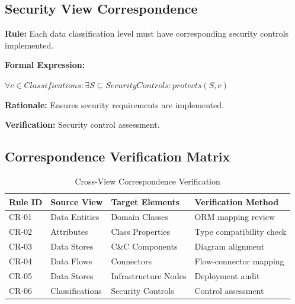 \documentclass[11pt,letterpaper]{article}
\begin{document}
\subsection{Security View Correspondence}

\begin{definitionbox}
\textbf{Rule:} Each data classification level must have corresponding security controls implemented.

\textbf{Formal Expression:}
\begin{center}
$\forall c \in Classifications : \exists S \subseteq SecurityControls : protects(S, c)$
\end{center}

\textbf{Rationale:} Ensures security requirements are implemented.

\textbf{Verification:} Security control assessment.
\end{definitionbox}

\subsection{Correspondence Verification Matrix}

\begin{table}[H]
\centering
\caption{Cross-View Correspondence Verification}
\small
\begin{tabular}{@{}L{2.3cm}L{3.2cm}L{3.2cm}L{4cm}@{}}
\toprule
\textbf{Rule ID} & \textbf{Source View} & \textbf{Target Elements} & \textbf{Verification Method} \\
\midrule
CR-01 & Data Entities & Domain Classes & ORM mapping review \\
CR-02 & Attributes & Class Properties & Type compatibility check \\
CR-03 & Data Stores & C\&C Components & Diagram alignment \\
CR-04 & Data Flows & Connectors & Flow-connector mapping \\
CR-05 & Data Stores & Infrastructure Nodes & Deployment audit \\
CR-06 & Classifications & Security Controls & Control assessment \\
\bottomrule
\end{tabular}
\end{table}

\end{document}

